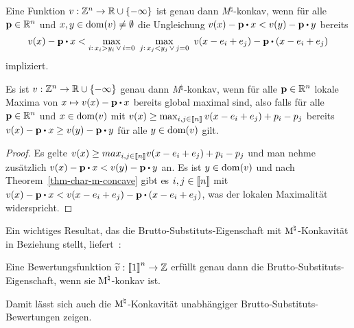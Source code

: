 \begin{theorem}\label{thm-char-m-concave}
	Eine Funktion $v:\mathbb{Z}^n \rightarrow \mathbb{R} \cup \{ -\infty \}$ ist genau dann \emph{M}$^\natural$-konkav, wenn für alle $\mathbf{p}\in\mathbb{R}^n$ und $x,y\in\operatorname{dom}(v)\neq\emptyset$ die Ungleichung $v(x) - \fp\bcdot x < v(y) - \fp \bcdot y$ bereits \[ 
		v(x) - \fp\bcdot x < 
			\max_{i:\, x_i > y_i \,  \vee \, i = 0} \,\,
				\max_{j:\, x_j < y_j \, \vee \, j=0} \,\,
					v(x - e_i + e_j) - \fp \bcdot (x - e_i + e_j)
	\]
	impliziert.
\end{theorem}
\begin{korollar}\label{cor-concave-local-global}
	Es ist $v: \mathbb{Z}^n \rightarrow \mathbb{R} \cup \{ -\infty \}$ genau dann \emph{M}$^\natural$-konkav, wenn für alle $\mathbf{p}\in\mathbb{R}^n$ lokale Maxima von $x \mapsto v(x) - \fp \bcdot x$ bereits global maximal sind, also 
	falls für alle $\mathbf{p}\in\mathbb{R}^n$ und $x\in\operatorname{dom}(v)$ mit $
	v(x)\geq \max_{i,j\in\left\llbracket n \right\rrbracket} v(x - e_i + e_j) + p_i - p_j
	$
	bereits $v(x) - \fp \bcdot x \geq v(y) - \fp \bcdot y$ für alle $y\in\operatorname{dom}(v)$ gilt.
\end{korollar}
\begin{proof}
	Es gelte $v(x) \geq max_{i,j\in\left\llbracket n \right\rrbracket} v(x - e_i + e_j) + p_i - p_j$ und man nehme zusätzlich $v(x) - \fp\bcdot x < v(y) - \fp \bcdot y$ an.
	Es ist $y\in\operatorname{dom}(v)$ und nach Theorem~\ref{thm-char-m-concave} gibt es $i,j\in\left\llbracket n \right\rrbracket$ mit $v(x) - \fp \bcdot x < v(x - e_i + e_j) - \fp\bcdot (x - e_i + e_j)$, was der lokalen Maximalität widerspricht.	
\end{proof}

Ein wichtiges Resultat, das die Brutto-Substituts-Eigenschaft mit $\textrm{\textup{M}}^\natural$-Konkavität in Beziehung stellt, liefert~\cite[Theorem 2.1]{Fujishige2003}:

\begin{theorem}\label{thm-fujishige-gs-iff-concave}
	Eine Bewertungsfunktion $\widetilde{v}:\left\llbracket 1 \right\rrbracket^n\rightarrow \mathbb{Z}$ erfüllt genau dann die Brutto-Substituts-Eigenschaft, wenn sie $\textrm{\textup{M}}^\natural$-konkav ist.
\end{theorem}

Damit lässt sich auch die $\textrm{\textup{M}}^\natural$-Konkavität unabhängiger Brutto-Substituts-Bewertungen zeigen.

